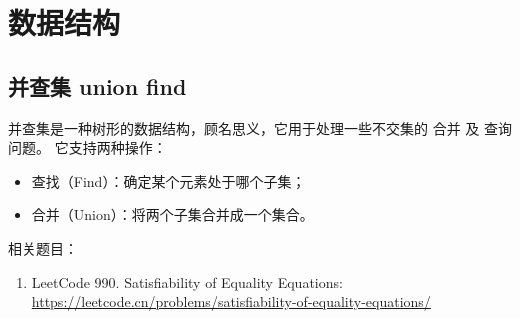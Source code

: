 \chapter{数据结构}

\begin{center}
\end{center}

\section{并查集 union find}

并查集是一种树形的数据结构，顾名思义，它用于处理一些不交集的 合并 及 查询 问题。 它支持两种操作： 

\begin{itemize}
    \item 查找（Find）：确定某个元素处于哪个子集；
    \item 合并（Union）：将两个子集合并成一个集合。
\end{itemize}



\ifshowLink
相关题目：
    \begin{enumerate}
        \item LeetCode 990. Satisfiability of Equality Equations: \href{https://leetcode.cn/problems/satisfiability-of-equality-equations/}{https://leetcode.cn/problems/satisfiability-of-equality-equations/}
    \end{enumerate}
\fi